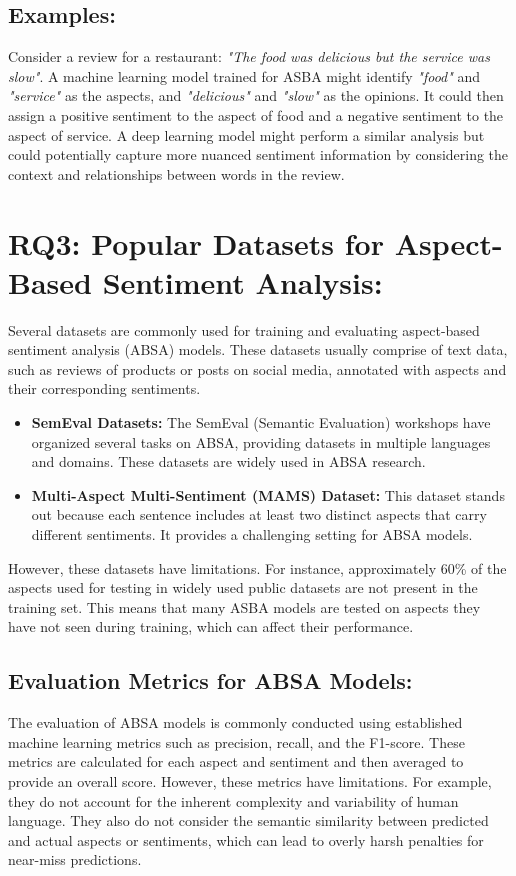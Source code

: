 \documentclass{article}
\begin{document}
\subsection{Examples: }
Consider a review for a restaurant: \textit{"The food was delicious but the service was slow"}. A machine learning model trained for ASBA might identify \textit{"food"} and \textit{"service"} as the aspects, and \textit{"delicious"} and \textit{"slow"} as the opinions. It could then assign a positive sentiment to the aspect of food and a negative sentiment to the aspect of service. A deep learning model might perform a similar analysis but could potentially capture more nuanced sentiment information by considering the context and relationships between words in the review.


\section{RQ3: Popular Datasets for Aspect-Based Sentiment Analysis: }
Several datasets are commonly used for training and evaluating aspect-based sentiment analysis (ABSA) models. These datasets usually comprise of text data, such as reviews of products or posts on social media, annotated with aspects and their corresponding sentiments\cite{Dhanith2023ACE}\cite{hua2023systematic}.
\begin{itemize}
    \item \textbf{SemEval Datasets: } The SemEval (Semantic Evaluation) workshops have organized several tasks on ABSA, providing datasets in multiple languages and domains. These datasets are widely used in ABSA research\cite{hua2023systematic}\cite{NazirIssues&Chall2023}.
    \item \textbf{Multi-Aspect Multi-Sentiment (MAMS) Dataset: } This dataset stands out because each sentence includes at least two distinct aspects that carry different sentiments. It provides a challenging setting for ABSA models\cite{Dhanith2023ACE}.
\end{itemize}
However, these datasets have limitations. For instance, approximately 60\% of the aspects used for testing in widely used public datasets are not present in the training set\cite{hua2023systematic}. This means that many ASBA models are tested on aspects they have not seen during training, which can affect their performance.

\subsection{Evaluation Metrics for ABSA Models: }
The evaluation of ABSA models is commonly conducted using established machine learning metrics such as precision, recall, and the F1-score. These metrics are calculated for each aspect and sentiment and then averaged to provide an overall score\cite{hua2023systematic}\cite{NazirIssues&Chall2023}.
However, these metrics have limitations. For example, they do not account for the inherent complexity and variability of human language. They also do not consider the semantic similarity between predicted and actual aspects or sentiments, which can lead to overly harsh penalties for near-miss predictions\cite{NazirIssues&Chall2023}.
\end{document}
